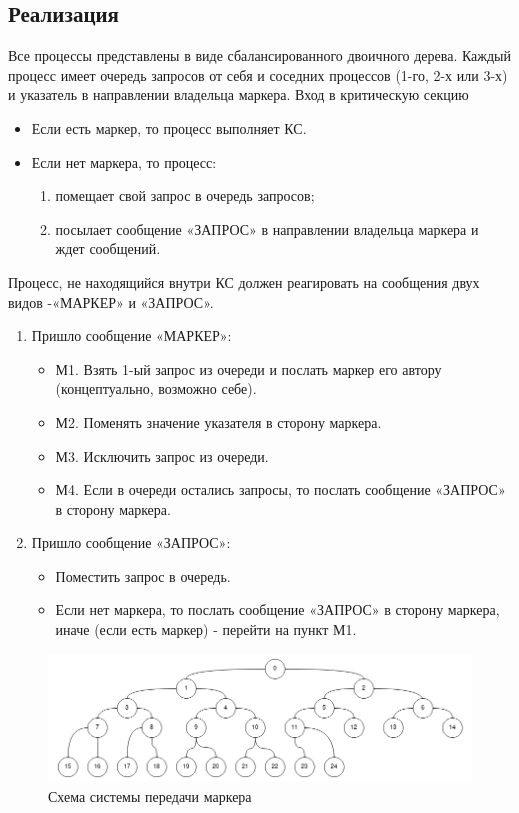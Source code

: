 \documentclass[a4paper,12pt,titlepage,final]{article}
\begin{document}
\subsection{Реализация}
Все процессы представлены в виде сбалансированного двоичного дерева. Каждый процесс имеет очередь запросов от себя и соседних процессов (1-го, 2-х или 3-х) и указатель в направлении владельца маркера.
Вход в критическую секцию
\begin{itemize}
    \item Если есть маркер, то процесс выполняет КС.
    \item Если нет маркера, то процесс:
    \begin{enumerate}
        \item помещает свой запрос в очередь запросов;
        \item посылает сообщение «ЗАПРОС» в направлении владельца маркера и ждет сообщений.
    \end{enumerate}
\end{itemize}
Процесс, не находящийся внутри КС должен реагировать на сообщения двух видов -«МАРКЕР» и «ЗАПРОС».
\begin{enumerate}
    \item Пришло сообщение «МАРКЕР»:
    \begin{itemize}
        \item М1. Взять 1-ый запрос из очереди и послать маркер его автору (концептуально, возможно себе).
        \item М2. Поменять значение указателя в сторону маркера.
        \item М3. Исключить запрос из очереди.
        \item М4. Если в очереди остались запросы, то послать сообщение «ЗАПРОС» в сторону маркера.
    \end{itemize}
    \item Пришло сообщение «ЗАПРОС»:
    \begin{itemize}
        \item Поместить запрос в очередь.
        \item Если нет маркера, то послать сообщение «ЗАПРОС» в сторону маркера, иначе (если есть маркер) - перейти на пункт М1.
    \end{itemize}
\end{enumerate}
\begin{figure}[h!]
  \includegraphics[width=1\linewidth]{marker.png}
  \caption{Схема системы передачи маркера}
  \label{fig:marker}
\end{figure}
\end{document}
